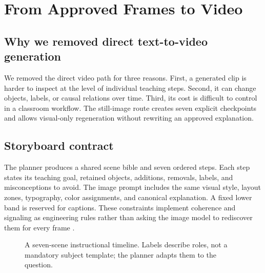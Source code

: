 \documentclass[11pt]{article}
\theoremstyle{plain}
\theoremstyle{definition}
\begin{document}
\section{From Approved Frames to Video}

\subsection{Why we removed direct text-to-video generation}

We removed the direct video path for three reasons. First, a generated clip is harder to inspect at the level of individual teaching steps. Second, it can change objects, labels, or causal relations over time. Third, its cost is difficult to control in a classroom workflow. The still-image route creates seven explicit checkpoints and allows visual-only regeneration without rewriting an approved explanation.

\subsection{Storyboard contract}

The planner produces a shared scene bible and seven ordered steps. Each step states its teaching goal, retained objects, additions, removals, labels, and misconceptions to avoid. The image prompt includes the same visual style, layout zones, typography, color assignments, and canonical explanation. A fixed lower band is reserved for captions. These constraints implement coherence and signaling as engineering rules rather than asking the image model to rediscover them for every frame \citep{mayer2021handbook}.

\begin{figure}[H]
\centering
{}
\caption{A seven-scene instructional timeline. Labels describe roles, not a mandatory subject template; the planner adapts them to the question.}
\label{fig:timeline}
\end{figure}
\end{document}
